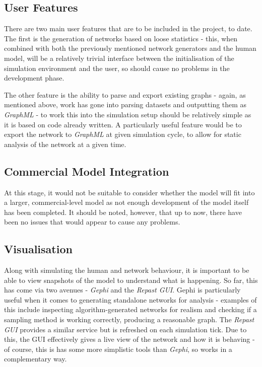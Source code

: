 \documentclass[]{article}
\begin{document}
\subsection{User Features}

There are two main user features that are to be included in the project, to date. The first is the generation of networks based on loose statistics - this, when combined with both the previously mentioned network generators and the human model, will be a relatively trivial interface between the initialisation of the simulation environment and the user, so should cause no problems in the development phase. 

The other feature is the ability to parse and export existing graphs - again, as mentioned above, work has gone into parsing datasets and outputting them as \emph{GraphML} - to work this into the simulation setup should be relatively simple as it is based on code already written. A particularly useful feature would be to export the network to \emph{GraphML} at given simulation cycle, to allow for static analysis of the network at a given time. 

\subsection{Commercial Model Integration}

At this stage, it would not be suitable to consider whether the model will fit into a larger, commercial-level model as not enough development of the model itself has been completed. It should be noted, however, that up to now, there have been no issues that would appear to cause any problems. 

\subsection{Visualisation}

Along with simulating the human and network behaviour, it is important to be able to view snapshots of the model to understand what is happening. So far, this has come via two avenues - \emph{Gephi} and the \emph{Repast GUI}. Gephi is particularly useful when it comes to generating standalone networks for analysis - examples of this include inspecting algorithm-generated networks for realism and checking if a sampling method is working correctly, producing a reasonable graph. The \emph{Repast GUI} provides a similar service but is refreshed on each simulation tick. Due to this, the GUI effectively gives a live view of the network and how it is behaving - of course, this is has some more simplistic tools than \emph{Gephi}, so works in a complementary way.
\end{document}
